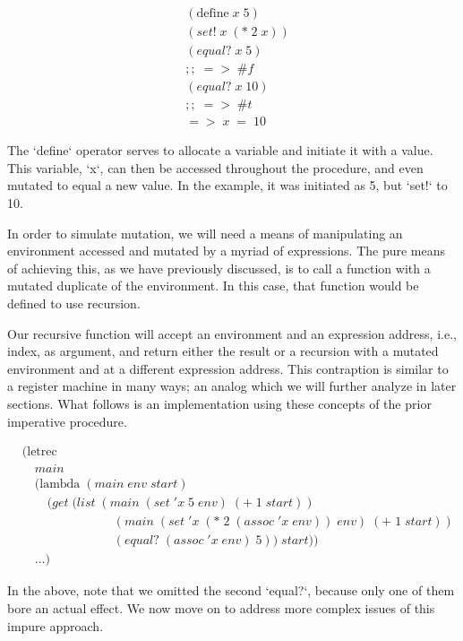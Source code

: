 \begin{align*}
& (\text{define} \; x \; 5)
\\& (set! \; x \; (* \; 2 \; x))
\\& (equal? \; x \; 5)
\\& ;; \; => \; \#f
\\& (equal? \; x \; 10)
\\& ;; \; => \; \#t
\\& => \; x \; = \; 10
\end{align*}

The `define` operator serves to allocate a variable and initiate it with a value. 
This variable, `x`, can then be accessed throughout the procedure, and even mutated 
to equal a new value. In the example, it was initiated as 5, but `set!` to 10.

In order to simulate mutation, we will need a means of manipulating an environment
accessed and mutated by a myriad of expressions. The pure means of achieving this,
as we have previously discussed, is to call a function with a mutated duplicate of
the environment. In this case, that function would be defined to use recursion.

Our recursive function will accept an environment and an expression address, i.e.,
index, as argument, and return either the result or a recursion with a mutated
environment and at a different expression address. This contraption is similar to 
a register machine in many ways; an analog which we will further analyze in later
sections. What follows is an implementation using these concepts of the prior
imperative procedure.

\begin{align*}
& (\text{letrec} \; 
\\& \quad main \; 
\\& \quad (\text{lambda} \; (main \; env \; start)
\\& \qquad (get \; (list \; (main \; (set \; 'x \; 5 \; env) \; (+ \; 1 \; start))
\\& \qquad \qquad \qquad \quad \; (main \; (set \; 'x \; (* \; 2 \; (assoc \; 'x \; env)) \; env) \; (+ \; 1 \; start))
\\& \qquad \qquad \qquad \quad \; (equal? \; (assoc \; 'x \; env) \; 5)) \; start))
\\& \quad \dots)
\end{align*}

In the above, note that we omitted the second `equal?`, because only one of them bore
an actual effect. We now move on to address more complex issues of this impure 
approach.

